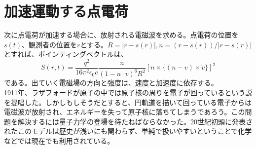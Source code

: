     \section{加速運動する点電荷}
        次に点電荷が加速する場合に、放射される電磁波を求める。点電荷の位置を$s(t)$、観測者の位置を$r$とする。$R = |r-s(r)|,n = (r-s(r))/|r-s(r)|$とすれば、ポインティングベクトルは、
            \[S(r,t) = \frac{q^2}{16\pi^2\epsilon_0c}\frac{n}{(1-n\cdot v)^6R^2}[n\times \{(n-v)\times \dot{v}\}]^2\]
        である。出ていく電磁場の方向と強度は、速度と加速度に依存する。\\
        1911年、ラザフォードが原子の中では原子核の周りを電子が回っているという説を提唱した。しかしもしそうだとすると、円軌道を描いて回っている電子からは電磁波が放射され、エネルギーを失って原子核に落ちてしまうであろう。この問題を解決するには量子力学の登場を待たねばならなかった。20世紀初頭に発表されたこのモデルは歴史が浅いにも関わらず、単純で扱いやすいということで化学などでは現在でも利用されている。